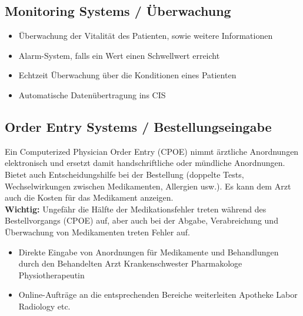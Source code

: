 \documentclass{report}
\theoremstyle{definition}
\theoremstyle{example}
\begin{document}
\subsection{Monitoring Systems / Überwachung}
\begin{itemize}
   \item Überwachung der Vitalität des Patienten, sowie weitere Informationen
   \item Alarm-System, falls ein Wert einen Schwellwert erreicht
   \item Echtzeit Überwachung über die Konditionen eines Patienten
   \item Automatische Datenübertragung ins CIS
\end{itemize}

\subsection{Order Entry Systems / Bestellungseingabe}
Ein Computerized Physician Order Entry (CPOE) nimmt ärztliche Anordnungen elektronisch und ersetzt damit handschriftliche oder mündliche Anordnungen. Bietet auch Entscheidungshilfe bei der Bestellung (doppelte Tests, Wechselwirkungen zwischen Medikamenten, Allergien usw.). Es kann dem Arzt auch die Kosten für das Medikament anzeigen.\\
\textbf{Wichtig:} Ungefähr die Hälfte der Medikationsfehler treten während des Bestellvorgangs (CPOE) auf, aber auch bei der Abgabe, Verabreichung und Überwachung von Medikamenten treten Fehler auf.
\begin{itemize}
   \item Direkte Eingabe von Anordnungen für Medikamente und Behandlungen durch den
   \subitem Behandelten Arzt 
   \subitem Krankenschwester
   \subitem Pharmakologe
   \subitem Physiotherapeutin
   \item Online-Aufträge an die entsprechenden Bereiche weiterleiten
   \subitem Apotheke
   \subitem Labor
   \subitem Radiology
   \subitem etc. 
\end{itemize}
\end{document}
